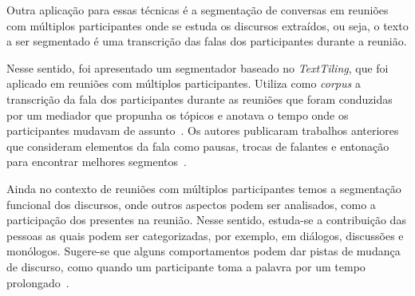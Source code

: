 Outra aplicação para essas técnicas é a segmentação de conversas em reuniões com múltiplos participantes onde se estuda os discursos extraídos, ou seja, o texto a ser segmentado é uma transcrição das falas dos participantes durante a reunião.
%

Nesse sentido, foi apresentado um segmentador baseado no  \textit{TextTiling}, que foi aplicado em reuniões com múltiplos participantes. Utiliza como \textit{corpus} a transcrição da fala dos participantes durante as reuniões que foram conduzidas por um mediador que propunha os tópicos e anotava o tempo onde os participantes mudavam de assunto~\cite{Banerjee2006}. 
Os autores publicaram trabalhos anteriores que consideram elementos da fala como pausas, trocas de falantes e entonação para encontrar melhores segmentos~\cite{Galley2003}.






Ainda no contexto de reuniões com múltiplos participantes temos a segmentação funcional dos discursos, onde outros aspectos podem ser analisados, como a participação dos presentes na reunião. Nesse sentido, estuda-se a contribuição das pessoas as quais podem ser categorizadas,  por exemplo, em diálogos, discussões e monólogos. Sugere-se que alguns comportamentos podem dar pistas de mudança de discurso, como quando um participante toma a palavra por um tempo prolongado~\cite{Bokaei2015}. 



